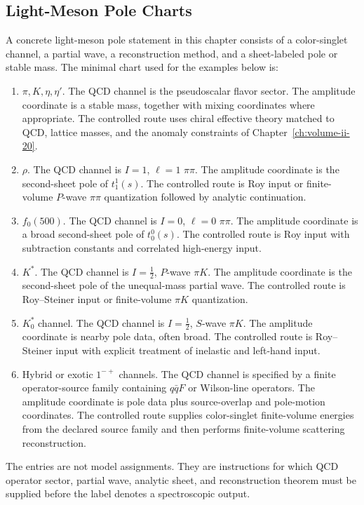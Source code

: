 \subsection{Light-Meson Pole Charts}
\label{subsec:qcd-light-meson-pole-charts}

\begin{definition}
\label{def:qcd-concrete-light-meson-pole-chart}
A concrete light-meson pole statement in this chapter consists of a
color-singlet channel, a partial wave, a reconstruction method, and a
sheet-labeled pole or stable mass.  The minimal chart used for the examples
below is:
\begin{enumerate}[label=(\roman*)]
  \item \(\pi,K,\eta,\eta'\).  The QCD channel is the pseudoscalar flavor
  sector.  The amplitude coordinate is a stable mass, together with mixing
  coordinates where appropriate.  The controlled route uses chiral effective
  theory matched to QCD, lattice masses, and the anomaly constraints of
  Chapter~\ref{ch:volume-ii-20}.
  \item \(\rho\).  The QCD channel is \(I=1\), \(\ell=1\) \(\pi\pi\).  The
  amplitude coordinate is the second-sheet pole of \(t_1^1(s)\).  The
  controlled route is Roy input or finite-volume \(P\)-wave \(\pi\pi\)
  quantization followed by analytic continuation.
  \item \(f_0(500)\).  The QCD channel is \(I=0\), \(\ell=0\) \(\pi\pi\).
  The amplitude coordinate is a broad second-sheet pole of \(t_0^0(s)\).  The
  controlled route is Roy input with subtraction constants and correlated
  high-energy input.
  \item \(K^\ast\).  The QCD channel is \(I=\frac12\), \(P\)-wave \(\pi K\).
  The amplitude coordinate is the second-sheet pole of the unequal-mass
  partial wave.  The controlled route is Roy--Steiner input or finite-volume
  \(\pi K\) quantization.
  \item \(K_0^\ast\) channel.  The QCD channel is \(I=\frac12\), \(S\)-wave
  \(\pi K\).  The amplitude coordinate is nearby pole data, often broad.  The
  controlled route is Roy--Steiner input with explicit treatment of inelastic
  and left-hand input.
  \item Hybrid or exotic \(1^{-+}\) channels.  The QCD channel is specified
  by a finite operator-source family containing \(q\bar qF\) or Wilson-line
  operators.  The amplitude coordinate is pole data plus source-overlap and
  pole-motion coordinates.
  The controlled route supplies color-singlet finite-volume energies from the
  declared source family and then performs finite-volume scattering
  reconstruction.
\end{enumerate}
The entries are not model assignments.  They are instructions for which QCD
operator sector, partial wave, analytic sheet, and reconstruction theorem must
be supplied before the label denotes a spectroscopic output.
\end{definition}


